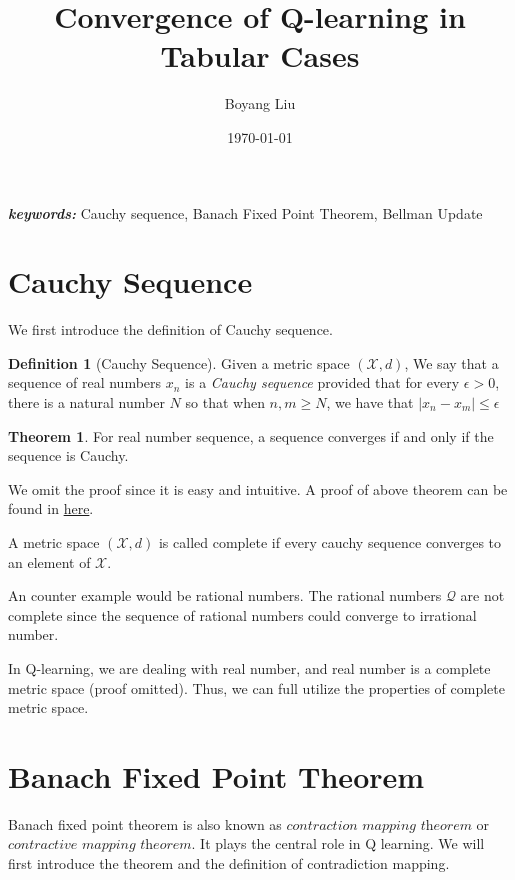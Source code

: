 \documentclass[a4paper]{article}
\title{Convergence of Q-learning in Tabular Cases}
\author{Boyang Liu}
\date{\today}
\theoremstyle{definition}
\newtheorem{defn}{Definition}[section]
\newtheorem{theo}{Theorem}[section]
\providecommand{\keywords}[1]{\textbf{\textit{keywords: }} #1}
\begin{document}
\maketitle


\keywords{Cauchy sequence, Banach Fixed Point Theorem, Bellman Update}

\section{Cauchy Sequence}
We first introduce the definition of Cauchy sequence.

\begin{defn}[Cauchy Sequence]
Given a metric space $(\mathcal{X}, d)$, We say that a sequence of real numbers ${x_n}$ is a \textit{Cauchy sequence} provided
that for every $\epsilon > 0$, there is a natural number $N$ so that when $n, m \geq N$, we have that $|x_n - x_m|\leq \epsilon$
\end{defn}

\begin{theo}
For real number sequence, a sequence converges if and only if the sequence is Cauchy.
\end{theo}

We omit the proof since it is easy and intuitive. A proof of above theorem can be found in \href{http://math.caltech.edu/~nets/lecture4.pdf}{here}.

A metric space $(\mathcal{X}, d)$ is called complete if every cauchy sequence converges to an element of $\mathcal{X}$.

An counter example would be rational numbers. The rational numbers $\mathcal{Q}$ are not complete since the sequence of rational numbers could converge to irrational number.

In Q-learning, we are dealing with real number, and real number is a complete metric space (proof omitted). Thus, we can full utilize the properties of complete metric space.
\section{Banach Fixed Point Theorem}
Banach fixed point theorem is also known as $\textit{contraction mapping theorem}$ or $\textit{contractive mapping theorem}$. It plays the central role in Q learning. We will first introduce the theorem and the definition of contradiction mapping.
\end{document}
